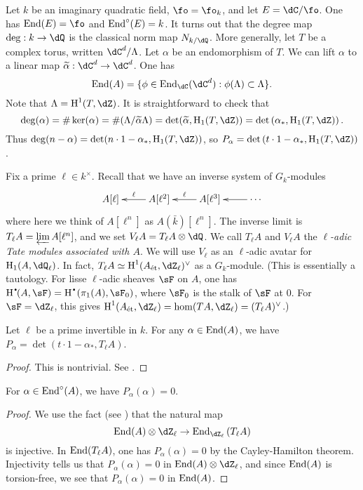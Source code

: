 \begin{example}
Let $k$ be an imaginary quadratic field, $\fo=\fo_k$, and let 
$E=\dC/\fo$. One has $\End(E)=\fo$ and $\operatorname{End}^\circ(E)=k$. It turns out that the 
degree map $\deg:k\to \dQ$ is the classical norm map $N_{k/\dQ}$.
More generally, let $T$ be a complex torus, written $\dC^d/\Lambda$. Let 
$\alpha$ be an endomorphism of $T$. We can lift $\alpha$ to a linear map 
$\widetilde\alpha:\dC^d\to \dC^d$. One has 
\[
  \End(A) = \{\phi\in \End_\dC(\dC^d) : \phi(\Lambda)\subset \Lambda\} \text{.}
\]
Note that $\Lambda=\h^1(T,\dZ)$. It is straightforward to check that 
\[
  \deg(\alpha) 
    = \#\ker(\alpha) 
    = \# (\Lambda/\widetilde\alpha\Lambda) 
    = \det(\widetilde\alpha,\h_1(T,\dZ)) 
    = \det\left(\alpha_\ast,\h_1(T,\dZ)\right) \text{.}
\]
Thus $\deg(n-\alpha)=\det(n\cdot 1-\alpha_\ast,\h_1(T,\dZ))$, so 
$P_\alpha=\det\left(t\cdot 1-\alpha_\ast,\h_1(T,\dZ)\right)$. 
\end{example}

Fix a prime $\ell\in k^\times$. Recall that we have an inverse system of 
$G_k$-modules 
\[\xymatrix{
  A[\ell] 
    & \ar[l]_-\ell A[\ell^2]
    & \ar[l]_-\ell A[\ell^3] 
    & \ar[l] \cdots
}\]
where here we think of $A[\ell^n]$ as $A(\bar k)[\ell^n]$. The inverse limit is 
$T_\ell A=\varprojlim A[\ell^n]$, and we set $V_\ell A=T_\ell A\otimes \dQ$. We 
call $T_\ell A$ and $V_\ell A$ the \emph{$\ell$-adic Tate modules associated with 
$A$}. We will use $V_\ell$ as an $\ell$-adic avatar for 
$\h_1(A,\dQ_\ell)$. In fact, $T_\ell A\simeq \h^1(\et A,\dZ_\ell)^\vee$ as a 
$G_k$-module. (This is essentially a tautology. For lisse $\ell$-adic sheaves 
$\sF$ on $A$, one has 
$\h^\bullet(A,\sF) = \h^\bullet\left(\pi_1(A),\sF_0\right)$, where $\sF_0$ is 
the stalk of $\sF$ at $0$. For $\sF=\dZ_\ell$, this gives 
$\h^1(\et A,\dZ_\ell) = \hom(T A,\dZ_\ell) = (T_\ell A)^\vee$.)

\begin{theorem}
Let $\ell$ be a prime invertible in $k$. For any $\alpha\in \operatorname{End}(A)$, we have 
$P_\alpha = \det(t\cdot 1-\alpha_\ast,T_\ell A)$. 
\end{theorem}
\begin{proof}
This is nontrivial. See \cite[I.10.20]{mi-av}. 
\end{proof}

\begin{corollary}
For $\alpha\in \operatorname{End}^\circ(A)$, we have $P_\alpha(\alpha)=0$. 
\end{corollary}
\begin{proof}
We use the fact (see \cite[I.10.15]{mi-av}) that the natural map 
\[
  \End(A)\otimes\dZ_\ell \to \End_{\dZ_\ell} \left(T_\ell A\right)
\]
is injective. In $\operatorname{End}(T_\ell A)$, one has $P_\alpha(\alpha)=0$ by the 
Cayley-Hamilton theorem. Injectivity tells us that 
$P_\alpha(\alpha)=0$ in $\End(A)\otimes\dZ_\ell$, and since $\operatorname{End}(A)$ is 
torsion-free, we see that $P_\alpha(\alpha)=0$ in $\operatorname{End}(A)$.
\end{proof}

